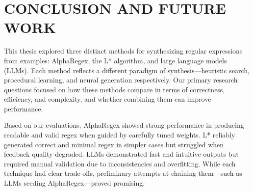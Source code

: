 %
%
%






\chapter{CONCLUSION AND FUTURE WORK}

\indent\indent This thesis explored three distinct methods for synthesizing regular expressions from examples: AlphaRegex, the L* algorithm, and large language models (LLMs). Each method reflects a different paradigm of synthesis—heuristic search, procedural learning, and neural generation respectively. Our primary research questions focused on how these methods compare in terms of correctness, efficiency, and complexity, and whether combining them can improve performance.

\indent\indent Based on our evaluations, AlphaRegex showed strong performance in producing readable and valid regex when guided by carefully tuned weights. L* reliably generated correct and minimal regex in simpler cases but struggled when feedback quality degraded. LLMs demonstrated fast and intuitive outputs but required manual validation due to inconsistencies and overfitting. While each technique had clear trade-offs, preliminary attempts at chaining them—such as LLMs seeding AlphaRegex—proved promising.

